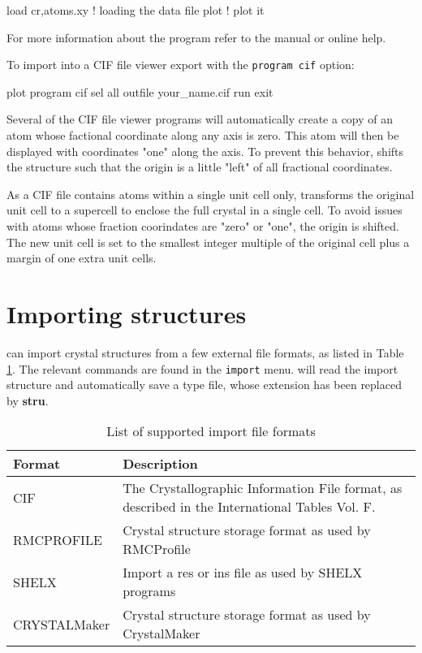 \begin{MacVerbatim}
    load cr,atoms.xy    ! loading the data file
    plot                ! plot it
\end{MacVerbatim}

For more information about the program \Kuplot refer to the
\Kuplot manual or online help.

To import into a CIF file viewer export with the {\tt program cif}
option:

\begin{MacVerbatim}
  plot
    program cif
    sel     all
    outfile your_name.cif
    run
  exit
\end{MacVerbatim}

Several of the CIF file viewer programs will automatically 
create a copy of an atom whose factional coordinate along 
any axis is zero. This atom will then be displayed with
coordinates "one" along the axis. To prevent this behavior,
\Discus shifts the structure such that the origin is a 
little "left" of all fractional coordinates. 

As a CIF file contains atoms within a single unit cell
only,  \Discus transforms the original unit cell to a
supercell to enclose the full crystal in a single cell.
To avoid issues with atoms whose fraction coorindates
are "zero" or "one", the origin is shifted. The new 
unit cell is set to the smallest integer multiple of
the original cell plus a margin of one extra unit cells.


\section{Importing structures \label{struc-import}}

\Discus can import crystal structures from a few external file formats, 
as listed
in Table \ref{struc-imp-tab1}. The relevant commands are found in the 
{\tt import} menu. \Discus will read the import structure and automatically
save a \Discus type file, whose extension has been replaced by {\bf stru}.

\begin{table}[!tbh]
\centering
\begin{tabularx}{\textwidth}{|p{30mm}|X|}
  \hline
  {\bf Format } & {\bf Description} \\
  \hline\hline
  CIF         & The Crystallographic Information File format, as    
                described in the International Tables 
                \cite{tables} Vol. F.\\
  \hline
  RMCPROFILE  & Crystal structure storage format as used by RMCProfile\\
  \hline
  SHELX & Import a res or ins file as used by SHELX programs \\
  \hline
  CRYSTALMaker & Crystal structure storage format as used by CrystalMaker \\
  \hline
\end{tabularx}
\caption{\label{struc-imp-tab1} List of supported import file formats}
\end{table}

